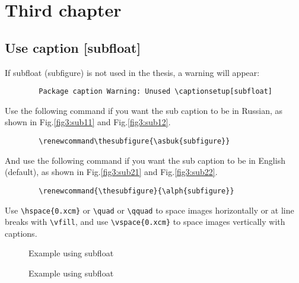 \chapter{Third chapter}
\label{ch:ch3}
\section{}\label{sec:ch3/sec1}

\section{Use caption [subfloat]}\label{sec:ch3/sect2}
If subfloat (subfigure) is not used in the thesis, a warning will appear:

{\color{brown}
	\begin{verbatim}
		Package caption Warning: Unused \captionsetup[subfloat]
	\end{verbatim}
}

Use the following command if you want the sub caption to be in Russian, as shown in Fig.\ref{fig3:sub11} and Fig.\ref{fig3:sub12}.
{\color{blue}
	\begin{verbatim}
		\renewcommand\thesubfigure{\asbuk{subfigure}}
	\end{verbatim}
}

And use the following command if you want the sub caption to be in English (default), as shown in Fig.\ref{fig3:sub21} and Fig.\ref{fig3:sub22}.
{\color{blue}
	\begin{verbatim}
		\renewcommand{\thesubfigure}{\alph{subfigure}}
	\end{verbatim}
}
Use \verb|\hspace{0.xcm}| or \verb|\quad| or \verb|\qquad| to space images horizontally or at line breaks with \verb|\vfill|, and use \verb|\vspace{0.xcm}| to space images vertically with captions.

\renewcommand\thesubfigure{\asbuk{subfigure}}
\begin{figure}
	\captionsetup[subfloat]{position=below}
	\centering
	\hspace{0.5cm} %
	\vspace{0.1cm}
	\caption{Example using subfloat}\label{fig3:subfloat1}
\end{figure}
\renewcommand{\thesubfigure}{\alph{subfigure}}
\begin{figure}
	\captionsetup[subfloat]{position=below}
	\centering
	\vfill %
	\vspace{0.1cm}
	\caption{Example using subfloat}\label{fig3:subfloat2}
\end{figure}